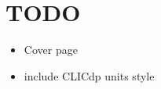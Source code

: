 \chapter{TODO}
\label{sec:todo}

\begin{itemize}
\item Cover page
\item include CLICdp units style
\end{itemize}